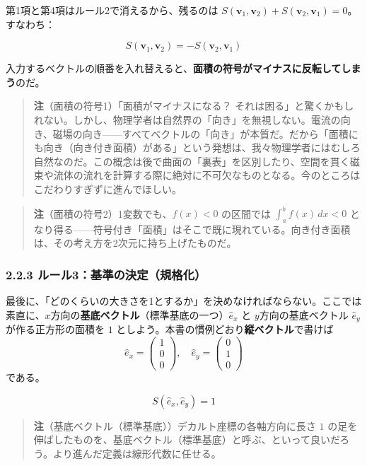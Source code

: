 \documentclass[a4paper,12pt,openany]{book}
\begin{document}
第1項と第4項はルール2で消えるから、残るのは
\(S(\mathbf{v}_1, \mathbf{v}_2) + S(\mathbf{v}_2, \mathbf{v}_1) = 0\)。すなわち：

\[S(\mathbf{v}_1, \mathbf{v}_2) = - S(\mathbf{v}_2, \mathbf{v}_1)\]

入力するベクトルの順番を入れ替えると、\textbf{面積の符号がマイナスに反転してしまう}のだ。

\begin{quote}
\textbf{注}（面積の符号1）「面積がマイナスになる？
それは困る」と驚くかもしれない。しかし、物理学者は自然界の「向き」を無視しない。電流の向き、磁場の向き——すべてベクトルの「向き」が本質だ。だから「面積にも向き（向き付き面積）がある」という発想は、我々物理学者にはむしろ自然なのだ。この概念は後で曲面の「裏表」を区別したり、空間を貫く磁束や流体の流れを計算する際に絶対に不可欠なものとなる。今のところはこだわりすぎずに進んでほしい。
\end{quote}

\begin{quote}
\textbf{注}（面積の符号2）1変数でも、\(f(x)<0\) の区間では
\(\displaystyle\int_a^b f(x)\,dx<0\)
となり得る——符号付き「面積」はそこで既に現れている。向き付き面積は、その考え方を2次元に持ち上げたものだ。
\end{quote}

\hypertarget{ux30ebux30fcux30eb3ux57faux6e96ux306eux6c7aux5b9aux898fux683cux5316}{%
\subsubsection{2.2.3
ルール3：基準の決定（規格化）}\label{ux30ebux30fcux30eb3ux57faux6e96ux306eux6c7aux5b9aux898fux683cux5316}}

最後に、「どのくらいの大きさを1とするか」を決めなければならない。ここでは素直に、\(x\)方向の\textbf{基底ベクトル}（標準基底の一つ）\(\hat{e}_x\)
と \(y\)方向の基底ベクトル \(\hat{e}_y\) が作る正方形の面積を \(1\)
としよう。本書の慣例どおり\textbf{縦ベクトル}で書けば
\[\hat{e}_x = \begin{pmatrix} 1 \\ 0 \\ 0 \end{pmatrix}, \quad \hat{e}_y = \begin{pmatrix} 0 \\ 1 \\ 0 \end{pmatrix}\]
である。

\[S(\hat{e}_x, \hat{e}_y) = 1\]

\begin{quote}
\textbf{注}（基底ベクトル（標準基底））デカルト座標の各軸方向に長さ
\(1\)
の足を伸ばしたものを、基底ベクトル（標準基底）と呼ぶ、といって良いだろう。より進んだ定義は線形代数に任せる。
\end{quote}
\end{document}
